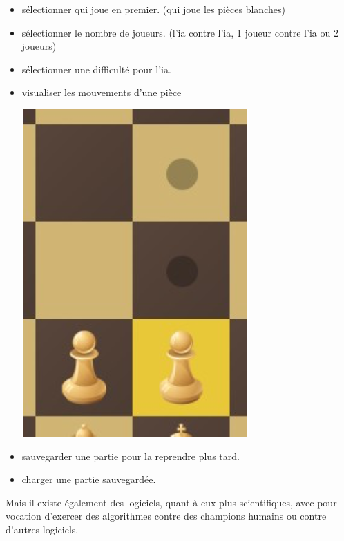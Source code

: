 \documentclass{article}
\begin{document}
\begin{itemize}
\item sélectionner qui joue en premier. (qui joue les pièces blanches)
\item sélectionner le nombre de joueurs. (l'ia contre l'ia, 1 joueur contre l'ia ou 2 joueurs)
\item sélectionner une difficulté pour l'ia.
\item visualiser les mouvements d'une pièce
\newline
\centerline{\includegraphics[scale = 0.5]{img/Piece_move.png}}
\item sauvegarder une partie pour la reprendre plus tard. 
\item charger une partie sauvegardée.
\newline\newline
\end{itemize}
Mais il existe également des logiciels, quant-à eux plus scientifiques, avec pour vocation d'exercer  des algorithmes contre des champions humains ou contre d'autres logiciels.
\end{document}

